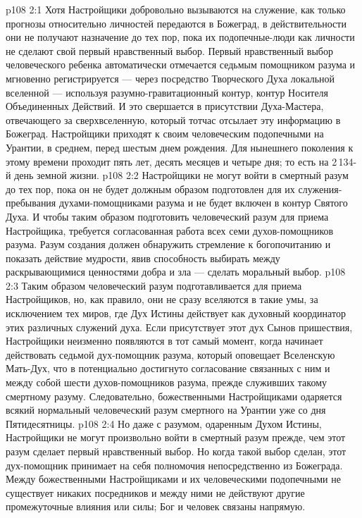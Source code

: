 \vs p108 2:1 Хотя Настройщики добровольно вызываются на служение, как только прогнозы относительно личностей передаются в Божеград, в действительности они не получают назначение до тех пор, пока их подопечные\hyp{}люди как личности не сделают свой первый нравственный выбор. Первый нравственный выбор человеческого ребенка автоматически отмечается седьмым помощником разума и мгновенно регистрируется --- через посредство Творческого Духа локальной вселенной --- используя разумно\hyp{}гравитационный контур, контур Носителя Объединенных Действий. И это свершается в присутствии Духа\hyp{}Мастера, отвечающего за сверхвселенную, который тотчас отсылает эту информацию в Божеград. Настройщики приходят к своим человеческим подопечными на Урантии, в среднем, перед шестым днем рождения. Для нынешнего поколения к этому времени проходит пять лет, десять месяцев и четыре дня; то есть на 2\,134\hyp{}й день земной жизни.
\vs p108 2:2 \pc Настройщики не могут войти в смертный разум до тех пор, пока он не будет должным образом подготовлен для их служения\hyp{}пребывания духами\hyp{}помощниками разума и не будет включен в контур Святого Духа. И чтобы таким образом подготовить человеческий разум для приема Настройщика, требуется согласованная работа всех семи духов\hyp{}помощников разума. Разум создания должен обнаружить стремление к богопочитанию и показать действие мудрости, явив способность выбирать между раскрывающимися ценностями добра и зла --- сделать моральный выбор.
\vs p108 2:3 Таким образом человеческий разум подготавливается для приема Настройщиков, но, как правило, они не сразу вселяются в такие умы, за исключением тех миров, где Дух Истины действует как духовный координатор этих различных служений духа. Если присутствует этот дух Сынов пришествия, Настройщики неизменно появляются в тот самый момент, когда начинает действовать седьмой дух\hyp{}помощник разума, который оповещает Вселенскую Мать\hyp{}Дух, что в потенциально достигнуто согласование связанных с ним и между собой шести духов\hyp{}помощников разума, прежде служивших такому смертному разуму. Следовательно, божественными Настройщиками одаряется всякий нормальный человеческий разум смертного на Урантии уже со дня Пятидесятницы.
\vs p108 2:4 Но даже с разумом, одаренным Духом Истины, Настройщики не могут произвольно войти в смертный разум прежде, чем этот разум сделает первый нравственный выбор. Но когда такой выбор сделан, этот дух\hyp{}помощник принимает на себя полномочия непосредственно из Божеграда. Между божественными Настройщиками и их человеческими подопечными не существует никаких посредников и между ними не действуют другие промежуточные влияния или силы; Бог и человек связаны напрямую.

